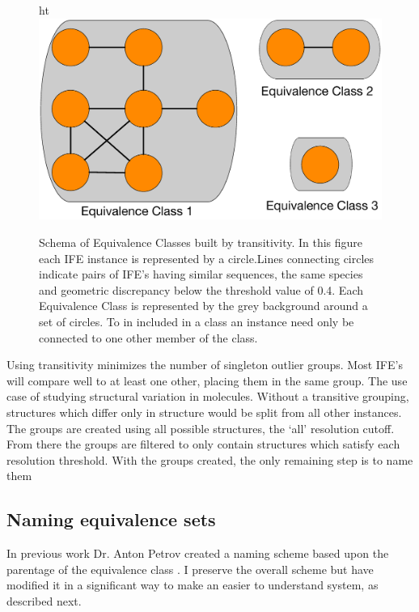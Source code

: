 \begin{figure}{ht}
  \includegraphics[width=\linewidth]{chapter-3/figs/ife-transtivity}
  \caption{Schema of Equivalence Classes built by transitivity. In this figure
    each IFE instance is represented by a circle.Lines connecting circles
    indicate pairs of IFE's having similar sequences, the same species and
    geometric discrepancy below the threshold value of 0.4. Each Equivalence
  Class is represented by the grey background around a set of circles. To in
included in a class an instance need only be connected to one other member of
the class.}
  \label{fig:transitivity}
\end{figure}

Using transitivity minimizes the number of singleton outlier groups. Most IFE’s
will compare well to at least one other, placing them in the same group. The use
case of studying structural variation in molecules. Without a transitive
grouping, structures which differ only in structure would be split from all
other instances. The groups are created using all possible structures, the ‘all’
resolution cutoff. From there the groups are filtered to only contain structures
which satisfy each resolution threshold. With the groups created, the only
remaining step is to name them

\subsection{Naming equivalence sets}

In previous work Dr. Anton Petrov created a naming scheme based upon the
parentage of the equivalence class \cite{Petrov2013}. I preserve the overall
scheme but have modified it in a significant way to make an easier to understand
system, as described next.

